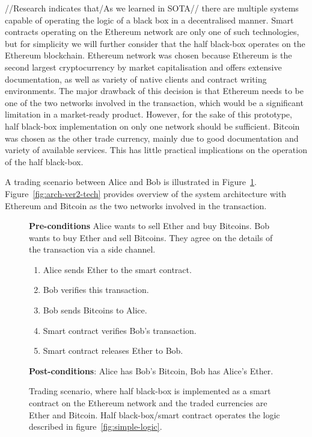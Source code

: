 //Research indicates that/As we learned in SOTA// there are multiple systems capable of operating the logic of a black box in a decentralised manner. Smart contracts operating on the Ethereum network are only one of such technologies, but for simplicity we will further consider that the half black-box operates on the Ethereum blockchain. Ethereum network was chosen because Ethereum is the second largest cryptocurrency by market capitalisation and offers extensive documentation, as well as variety of native clients and contract writing environments. The major drawback of this decision is that Ethereum needs to be one of the two networks involved in the transaction, which would be a significant limitation in a market-ready product. However, for the sake of this prototype, half black-box implementation on only one network should be sufficient. Bitcoin was chosen as the other trade currency, mainly due to good documentation and variety of available services. This has little practical implications on the operation of the half black-box.

A trading scenario between Alice and Bob is illustrated in Figure~\ref{fig:ethereum-case}. Figure~\ref{fig:arch-ver2-tech} provides overview of the system architecture with Ethereum and Bitcoin as the two networks involved in the transaction.

\begin{figure}[ht]
    \begin{framed}
    \textbf{Pre-conditions} Alice wants to sell Ether and buy Bitcoins. Bob wants to buy Ether and sell Bitcoins. They agree on the details of the transaction via a side channel.
 
    \begin{enumerate}[noitemsep]
        \item Alice sends Ether to the smart contract.
        \item Bob verifies this transaction.
        \item Bob sends Bitcoins to Alice.
        \item Smart contract verifies Bob’s transaction.
        \item Smart contract releases Ether to Bob.
    \end{enumerate}
      
    \textbf{Post-conditions}: Alice has Bob’s Bitcoin, Bob has Alice’s Ether.

    \end{framed}
    \caption{Trading scenario, where half black-box is implemented as a smart contract on the Ethereum network and the traded currencies are Ether and Bitcoin. Half black-box/smart contract operates the logic described in figure~\ref{fig:simple-logic}.}
    \label{fig:ethereum-case}
\end{figure}

